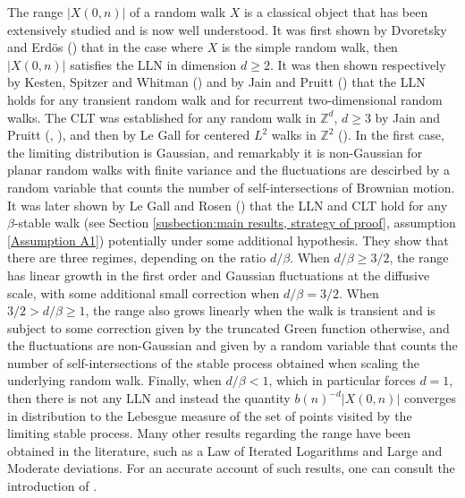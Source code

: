 \documentclass[10pt,a4paper]{amsart}
\newcommand{\1}{\mathds{1}}
\newcommand{\ZZ}{\mathbb Z}
\numberwithin{equation}{section}
\begin{document}
The range $|X(0,n)|$ of a random walk $X$ is a classical object that has been extensively studied and is now well understood. It was first shown by Dvoretsky and Erdös (\cite{DvoretzkyErdos1951}) that in the case where $X$ is the simple random walk, then $|X(0,n)|$ satisfies the LLN in dimension $d\ge2$. It was then shown respectively by Kesten, Spitzer and Whitman (\cite{Spitzer1965}) and by Jain and Pruitt (\cite{JainPruitt1972}) that the LLN holds for any transient random walk and for recurrent two-dimensional random walks. The CLT was established for any random walk in $\ZZ^d$, $d\ge3$ by Jain and Pruitt (\cite{JainPruitt1971}, \cite{JainPruitt1974}), and then by Le Gall for centered $L^2$ walks in $\ZZ^2$ (\cite{LeGallIntersectionsMarchesAléatoires1986}). In the first case, the limiting distribution is Gaussian, and remarkably it is non-Gaussian for planar random walks with finite variance and the fluctuations are descirbed by a random variable that counts the number of self-intersections of Brownian motion. It was later shown by Le Gall and Rosen (\cite{LeGallRosenRangeOfStableRandomWalks1991}) that the LLN and CLT hold for any $\beta$-stable walk (see Section \ref{susbection:main results, strategy of proof}, assumption \ref{Assumption A1}) potentially under some additional hypothesis. They show that there are three regimes, depending on the ratio $d/\beta$. When $d/\beta\ge3/2$, the range has linear growth in the first order and Gaussian fluctuations at the diffusive scale, with some additional small correction when $d/\beta=3/2$. When $3/2>d/\beta\ge1$, the range also grows linearly when the walk is transient and is subject to some correction given by the truncated Green function otherwise, and the fluctuations are non-Gaussian and given by a random variable that counts the number of self-intersections of the stable process obtained when scaling the underlying random walk. Finally, when $d/\beta<1$, which in particular forces $d=1$, then there is not any LLN and instead the quantity $b(n)^{-d}|X(0,n)|$ converges in distribution to the Lebesgue measure of the set of points visited by the limiting stable process. Many other results regarding the range have been obtained in the literature, such as a Law of Iterated Logarithms and Large and Moderate deviations. For an accurate account of such results, one can consult the introduction of \cite{BassChenRosenModerateDeviations2009}. 
\end{document}
